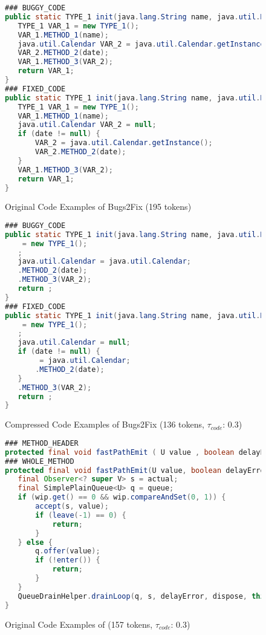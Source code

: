 \begin{figure}[!h]
\begin{tcolorbox}
\begin{lstlisting}[language=Java,frame=single,framerule=0pt]
### BUGGY_CODE 
public static TYPE_1 init(java.lang.String name, java.util.Date date) {
   TYPE_1 VAR_1 = new TYPE_1();
   VAR_1.METHOD_1(name);
   java.util.Calendar VAR_2 = java.util.Calendar.getInstance();
   VAR_2.METHOD_2(date);
   VAR_1.METHOD_3(VAR_2);
   return VAR_1;
}
### FIXED_CODE   
public static TYPE_1 init(java.lang.String name, java.util.Date date) {
   TYPE_1 VAR_1 = new TYPE_1();
   VAR_1.METHOD_1(name);
   java.util.Calendar VAR_2 = null;
   if (date != null) {
       VAR_2 = java.util.Calendar.getInstance();
       VAR_2.METHOD_2(date);
   } 
   VAR_1.METHOD_3(VAR_2);
   return VAR_1;
}
\end{lstlisting}
\end{tcolorbox}
\caption{Original Code Examples of Bugs2Fix (195 tokens)}
\label{fig:code-example}
\end{figure}

\begin{figure}[!h]
\begin{tcolorbox}
\begin{lstlisting}[language=Java,frame=single,framerule=0pt]
### BUGGY_CODE 
public static TYPE_1 init(java.lang.String name, java.util.Date date) {
    = new TYPE_1();
   ;
   java.util.Calendar = java.util.Calendar;
   .METHOD_2(date);
   .METHOD_3(VAR_2);
   return ;
}
### FIXED_CODE   
public static TYPE_1 init(java.lang.String name, java.util.Date date) {
    = new TYPE_1();
   ;
   java.util.Calendar = null;
   if (date != null) {
        = java.util.Calendar;
       .METHOD_2(date);
   } 
   .METHOD_3(VAR_2);
   return ;
}
\end{lstlisting}
\end{tcolorbox}
\caption{Compressed Code Examples of Bugs2Fix (136 tokens, $\tau_{code}$: 0.3)}
\label{fig:code-example}
\end{figure}

\begin{figure}[!h]
\begin{tcolorbox}
\begin{lstlisting}[language=Java,frame=single,framerule=0pt]
### METHOD_HEADER 
protected final void fastPathEmit ( U value , boolean delayError , Disposable dispose )
### WHOLE_METHOD  
protected final void fastPathEmit(U value, boolean delayError, Disposable dispose) {
   final Observer<? super V> s = actual;
   final SimplePlainQueue<U> q = queue;
   if (wip.get() == 0 && wip.compareAndSet(0, 1)) {
       accept(s, value);
       if (leave(-1) == 0) {
           return;
       }
   } else {
       q.offer(value);
       if (!enter()) {
           return;
       }
   }
   QueueDrainHelper.drainLoop(q, s, delayError, dispose, this);
}
\end{lstlisting}
\end{tcolorbox}
\caption{Original Code Examples  of \taskthree (157 tokens, $\tau_{code}$: 0.3)}
\label{fig:code-example}
\end{figure}


